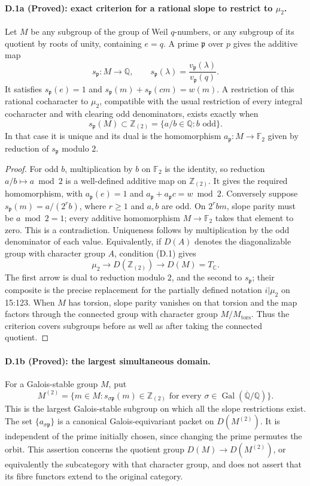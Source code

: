 \paragraph{D.1a (Proved): exact criterion for a rational slope to restrict to $\mu _2$.}
Let $M$ be any subgroup of the group of Weil $q$-numbers, or any subgroup
of its quotient by roots of unity, containing $e=q$. A prime
$\mathfrak p$ over $p$ gives the additive map
\[
 s_{\mathfrak p}:M\longrightarrow\mathbb Q,
 \qquad s_{\mathfrak p}(\lambda)=
 \frac{v_{\mathfrak p}(\lambda)}{v_{\mathfrak p}(q)}.
\]
It satisfies $s_{\mathfrak p}(e)=1$ and
$s_{\mathfrak p}(m)+s_{\mathfrak p}(cm)=w(m)$.
A restriction of this rational cocharacter to $\mu _2$, compatible with the
usual restriction of every integral cocharacter and with clearing odd
 denominators, exists exactly when
\[
 s_{\mathfrak p}(M)\subset\mathbb Z_{(2)}
 =\{a/b\in\mathbb Q:b\text{ odd}\}.
 \tag{D.1}
\]
In that case it is unique and its dual is the homomorphism
$a_{\mathfrak p}:M\to\mathbb F _2$ given by reduction of
$s_{\mathfrak p}$ modulo $2$.

\begin{proof}
For odd $b$, multiplication by $b$ on $\mathbb F _2$ is the identity, so reduction
$a/b\mapsto a\bmod2$ is a well-defined additive map on $\mathbb Z_{(2)}$.
It gives the required homomorphism, with $a_{\mathfrak p}(e)=1$ and
$a_{\mathfrak p}+a_{\mathfrak p}c=w\bmod2$. Conversely suppose
$s_{\mathfrak p}(m)=a/(2^r b)$, where $r\geq1$ and $a,b$ are odd.
On $2^r b m$, slope parity must be $a\bmod2=1$; every additive homomorphism
$M\to\mathbb F _2$ takes that element to zero. This is a contradiction.
Uniqueness follows by multiplication by the odd denominator of each value.
Equivalently, if $D(A)$ denotes the diagonalizable group with character group
$A$, condition (D.1) gives
\[
 \mu _2\longrightarrow D(\mathbb Z_{(2)})
 \longrightarrow D(M)=T_{\mathbb C}.
\]
The first arrow is dual to reduction modulo $2$, and the second to
$s_{\mathfrak p}$; their composite is the precise replacement for the
partially defined notation $i|\mu _2$ on 15:123.
When $M$ has torsion, slope parity vanishes on that torsion and the
map factors through the connected group with character group
$M/M_{\mathrm{tors}}$. Thus the criterion covers subgroups before as
well as after taking the connected quotient.
\end{proof}

\paragraph{D.1b (Proved): the largest simultaneous domain.}
For a Galois-stable group $M$, put
\[
 M^{(2)}=\{m\in M:s_{\sigma\mathfrak p}(m)\in\mathbb Z_{(2)}
       \text{ for every }\sigma\in\operatorname{Gal}(\overline{\mathbb Q}/\mathbb Q)\}.
 \tag{D.2}
\]
This is the largest Galois-stable subgroup on which all the slope restrictions
exist. The set $\{a_{\sigma\mathfrak p}\}$ is a canonical Galois-equivariant
packet on $D(M^{(2)})$. It is independent of the prime initially chosen,
since changing the prime permutes the orbit. This assertion concerns the
quotient group $D(M)\to D(M^{(2)})$, or equivalently the subcategory with that
character group, and does not assert that its fibre functors extend to the
original category.

